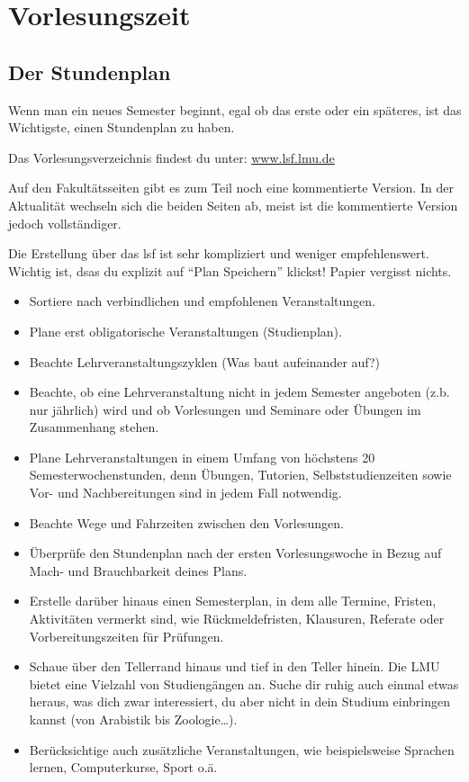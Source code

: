 ﻿
\section{Vorlesungszeit}

\subsection{Der Stundenplan}

Wenn man ein neues Semester beginnt, egal ob das erste oder ein späteres, ist das Wichtigste, einen Stundenplan zu haben.


Das Vorlesungsverzeichnis findest du unter: \url{www.lsf.lmu.de}

Auf den Fakultätsseiten gibt es zum Teil noch eine kommentierte
Version. In der Aktualität wechseln sich die beiden Seiten ab, meist
ist die kommentierte Version jedoch vollständiger.

Die Erstellung über das lsf ist sehr kompliziert und weniger
empfehlenswert.  Wichtig ist, dsas du explizit auf ``Plan Speichern''
klickst!  Papier vergisst nichts.

\begin{itemize}
	\item Sortiere nach verbindlichen und empfohlenen Veranstaltungen.
	\item Plane erst obligatorische Veranstaltungen (Studienplan).
	\item Beachte Lehrveranstaltungszyklen (Was baut aufeinander auf?)
	\item Beachte, ob eine Lehrveranstaltung nicht in jedem
          Semester angeboten (z.b. nur jährlich) wird und ob
          Vorlesungen und Seminare oder Übungen im Zusammenhang
          stehen.
	\item Plane Lehrveranstaltungen in einem Umfang von höchstens 20 Semesterwochenstunden, denn Übungen, Tutorien, Selbststudienzeiten sowie Vor- und Nachbereitungen sind in jedem Fall notwendig.
	\item Beachte Wege und Fahrzeiten zwischen den Vorlesungen.
	\item Überprüfe den Stundenplan nach der ersten Vorlesungswoche in Bezug auf Mach- und Brauchbarkeit deines Plans.
	\item Erstelle darüber hinaus einen Semesterplan, in dem alle Termine, Fristen, Aktivitäten vermerkt sind, wie Rückmeldefristen, Klausuren, Referate oder Vorbereitungszeiten für Prüfungen.
	\item Schaue über den Tellerrand hinaus und tief in den Teller hinein. Die LMU bietet eine Vielzahl von Studiengängen an. Suche dir ruhig auch einmal etwas heraus, was dich zwar interessiert, du aber nicht in dein Studium einbringen kannst (von Arabistik bis Zoologie\ldots).
	\item Berücksichtige auch zusätzliche Veranstaltungen, wie beispielsweise Sprachen lernen, Computerkurse, Sport o.ä.
\end{itemize}


